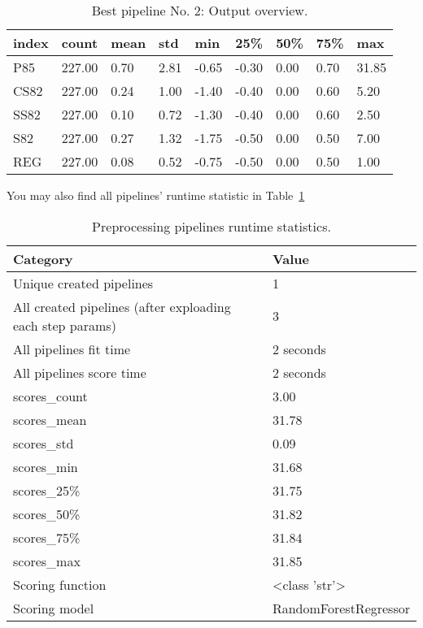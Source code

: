 \documentclass{article}%
\begin{document}
%


\begin{table}[H]%
\begin{center}%
\renewcommand{\arraystretch}{1.5}%
\begin{tabular}{l l l l l l l l l}%
\hline%
\textbf{index}&\textbf{count}&\textbf{mean}&\textbf{std}&\textbf{min}&\textbf{25\%}&\textbf{50\%}&\textbf{75\%}&\textbf{max}\\%
\hline%
P85&227.00&0.70&2.81&{-}0.65&{-}0.30&0.00&0.70&31.85\\%
CS82&227.00&0.24&1.00&{-}1.40&{-}0.40&0.00&0.60&5.20\\%
SS82&227.00&0.10&0.72&{-}1.30&{-}0.40&0.00&0.60&2.50\\%
S82&227.00&0.27&1.32&{-}1.75&{-}0.50&0.00&0.50&7.00\\%
REG&227.00&0.08&0.52&{-}0.75&{-}0.50&0.00&0.50&1.00\\%
\hline%
\end{tabular}%
\end{center}%
\caption{Best pipeline No. 2: Output overview.}%
\end{table}

%
You may also find all pipelines' runtime statistic in %
Table~\ref{tab:preprocessing_pipelines_runtime_statistics}%


\begin{table}[H]%
\begin{center}%
\renewcommand{\arraystretch}{1.5}%
\begin{tabular}{l l}%
\hline%
\textbf{Category}&\textbf{Value}\\%
\hline%
Unique created pipelines&1\\%
All created pipelines (after exploading each step params)&3\\%
All pipelines fit time&2 seconds\\%
All pipelines score time&2 seconds\\%
scores\_count&3.00\\%
scores\_mean&31.78\\%
scores\_std&0.09\\%
scores\_min&31.68\\%
scores\_25\%&31.75\\%
scores\_50\%&31.82\\%
scores\_75\%&31.84\\%
scores\_max&31.85\\%
Scoring function&<class 'str'>\\%
Scoring model&RandomForestRegressor\\%
\hline%
\end{tabular}%
\end{center}%
\caption{Preprocessing pipelines runtime statistics.}%
\label{tab:preprocessing_pipelines_runtime_statistics}%
\end{table}
\end{document}
